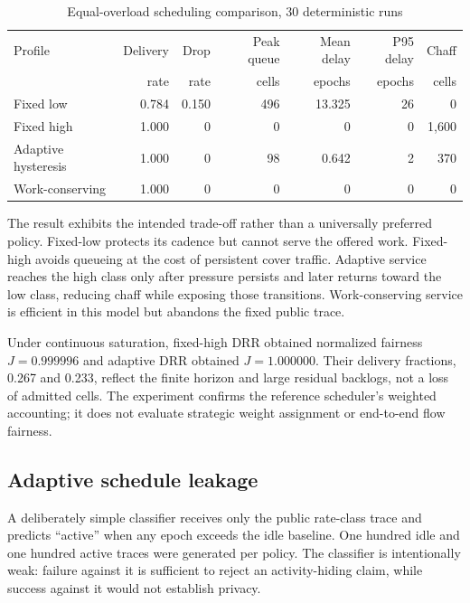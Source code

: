 \documentclass[11pt,oneside]{article}
\begin{document}
\begin{table}[ht]
\centering
\caption{Equal-overload scheduling comparison, 30 deterministic runs}
\label{tab:t2congestion}
\begin{tabularx}{\textwidth}{@{}p{}rrrrrr@{}}
\toprule
Profile & Delivery & Drop & Peak queue & Mean delay & P95 delay & Chaff \\
 & rate & rate & cells & epochs & epochs & cells \\
\midrule
Fixed low & 0.784 & 0.150 & 496 & 13.325 & 26 & 0 \\
Fixed high & 1.000 & 0 & 0 & 0 & 0 & 1,600 \\
Adaptive hysteresis & 1.000 & 0 & 98 & 0.642 & 2 & 370 \\
Work-conserving & 1.000 & 0 & 0 & 0 & 0 & 0 \\
\bottomrule
\end{tabularx}
\end{table}

The result exhibits the intended trade-off rather than a universally preferred policy. Fixed-low protects its cadence but cannot serve the offered work. Fixed-high avoids queueing at the cost of persistent cover traffic. Adaptive service reaches the high class only after pressure persists and later returns toward the low class, reducing chaff while exposing those transitions. Work-conserving service is efficient in this model but abandons the fixed public trace.

Under continuous saturation, fixed-high DRR obtained normalized fairness $J=0.999996$ and adaptive DRR obtained $J=1.000000$. Their delivery fractions, 0.267 and 0.233, reflect the finite horizon and large residual backlogs, not a loss of admitted cells. The experiment confirms the reference scheduler's weighted accounting; it does not evaluate strategic weight assignment or end-to-end flow fairness.

\subsection{Adaptive schedule leakage}

A deliberately simple classifier receives only the public rate-class trace and predicts ``active'' when any epoch exceeds the idle baseline. One hundred idle and one hundred active traces were generated per policy. The classifier is intentionally weak: failure against it is sufficient to reject an activity-hiding claim, while success against it would not establish privacy.
\end{document}
